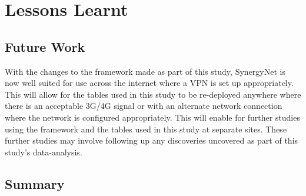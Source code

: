 \documentclass[a4paper,11pt]{article}
\begin{document}
\section{Lessons Learnt}


\subsection{Future Work}

With the changes to the framework made as part of this study, SynergyNet is now well suited for use across the internet where a VPN is set up appropriately.
This will allow for the tables used in this study to be re-deployed anywhere where there is an acceptable 3G/4G signal or with an alternate network connection where the network is configured appropriately.
This will enable for further studies using the framework and the tables used in this study at separate sites.
These further studies may involve following up any discoveries uncovered as part of this study’s data-analysis.

\subsection{Summary} %




\end{document}
